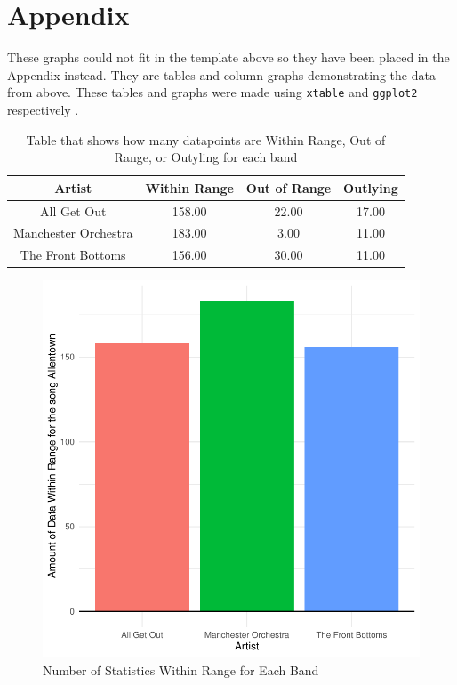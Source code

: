 \documentclass{article}\usepackage[]{graphicx}\usepackage[]{xcolor}
\makeatletter
\def\maxwidth{ %
  \ifdim\Gin@nat@width>\linewidth
    \linewidth
  \else
    \Gin@nat@width
  \fi
}
\newenvironment{knitrout}{}{} %
\makeatother
\begin{document}
\newpage
\onecolumn
\section{Appendix}
These graphs could not fit in the template above so they have been placed in the Appendix instead. They are tables and column graphs demonstrating the data from above. These tables and graphs were made using \texttt{xtable} and \texttt{ggplot2} respectively \citep{xtable} \citep{ggplot}.
\begin{table}[ht]
\centering
\begin{tabular}{|c|ccc|}
\hline
Artist & Within Range & Out of Range & Outlying \\ 
\hline
All Get Out & 158.00 & 22.00 & 17.00 \\ 
Manchester Orchestra & 183.00 & 3.00 & 11.00 \\ 
The Front Bottoms & 156.00 & 30.00 & 11.00 \\ 
\hline
\end{tabular}
\caption{Table that shows how many datapoints are Within Range, Out of Range, or Outyling for each band}
\label{Table 1}
\end{table}

\begin{figure}[ht]
\begin{center}
\begin{knitrout}
\color{fgcolor}
\includegraphics[width=\maxwidth]{figure/unnamed-chunk-1-1} 
\end{knitrout}
\caption{Number of Statistics Within Range for Each Band}
\label{Figure 1}
\end{center}
\end{figure}
\end{document}
